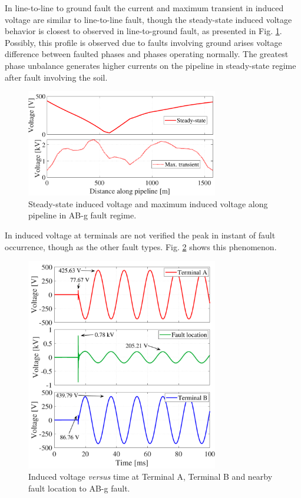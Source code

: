 \documentclass[5p,twocolumn]{elsarticle}
\begin{document}
In line-to-line to ground fault the current and maximum transient in induced voltage are similar to line-to-line fault, though the steady-state induced voltage behavior is closest to observed in line-to-ground fault, as presented in Fig. \ref{fig:ABGindVoltage}. Possibly, this profile is observed due to faults involving ground arises voltage difference between faulted phases and phases operating normally. The greatest phase unbalance generates higher currents on the pipeline in steady-state regime after fault involving the soil.    

\begin{figure}[h]
	\begin{center}
		\includegraphics[width=8.4cm]{img/ABGindVoltage.pdf}    %
		\caption{Steady-state induced voltage and maximum induced voltage along pipeline in AB-g fault regime.} 
		\label{fig:ABGindVoltage}
	\end{center}
\end{figure}

In induced voltage at terminals are not verified the peak in instant of fault occurrence, though as the other fault types. Fig. \ref{fig:ABGindVoltage3plots} shows this phenomenon. 

\begin{figure}[h]
	\begin{center}
		\includegraphics[width=8.4cm]{img/ABGindVoltage_3plots.pdf}    %
		\caption{Induced voltage \textit{versus} time at Terminal A, Terminal B and nearby fault location to AB-g fault.} 
		\label{fig:ABGindVoltage3plots}
	\end{center}
\end{figure}
\end{document}
